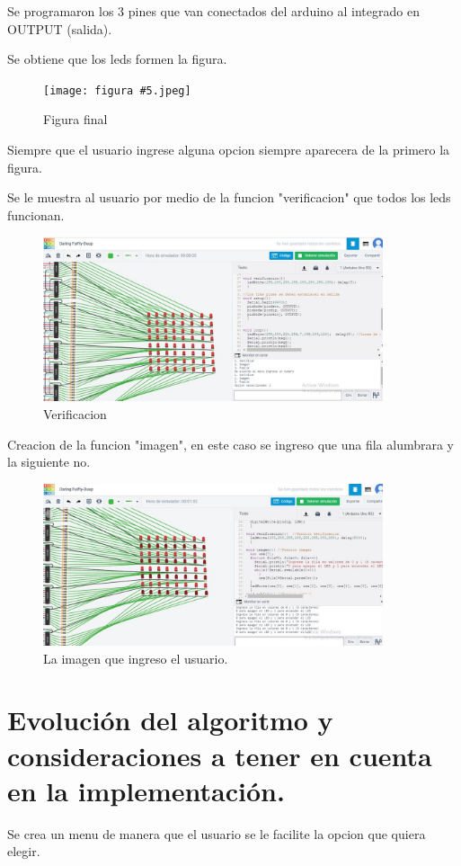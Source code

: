 \documentclass{article}
\begin{document}
Se programaron los 3 pines que van conectados del arduino al integrado en OUTPUT (salida).

Se obtiene que los leds formen la figura.

\begin{figure}[h]
\texttt{[image: figura \#5.jpeg]}
\centering
\caption{Figura final}
\label{fig:figura #5}
\end{figure}
\newpage
Siempre que el usuario ingrese alguna opcion siempre aparecera de la primero la figura.

Se le muestra al usuario por medio de la funcion "verificacion" que todos los leds funcionan.

\begin{figure}[h]
\includegraphics[width=10cm]{Verificacion.jpeg}
\centering
\caption{Verificacion}
\label{fig:Verificacion}
\end{figure}
\newpage

Creacion de la funcion "imagen", en este caso se ingreso que una fila alumbrara y la siguiente no.
\begin{figure}[h]
\includegraphics[width=10cm]{Avance 3.jpeg}
\centering
\caption{La imagen que ingreso el usuario.}
\label{fig:Avance 3}
\end{figure}


\section{Evolución del algoritmo y consideraciones a tener en cuenta en la implementación.}\label{intro}
Se crea un menu de manera que el usuario se le facilite la opcion que quiera elegir.
\end{document}
